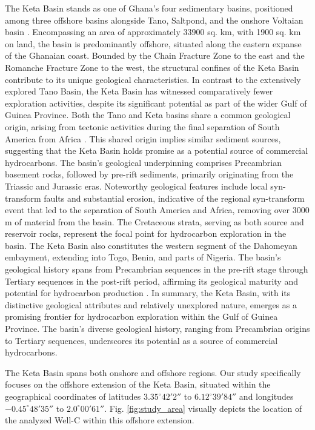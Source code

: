 \documentclass{gji}
\begin{document}
The Keta Basin stands as one of Ghana's four sedimentary basins, positioned among three offshore basins alongside Tano, Saltpond, and the onshore Voltaian basin \citep{lambon2020}.
Encompassing an area of approximately $33900$ sq. km, with 1900 sq. km on land, the basin is predominantly offshore, situated along the eastern expanse of the Ghanaian coast.
Bounded by the Chain Fracture Zone to the east and the Romanche Fracture Zone to the west, the structural confines of the Keta Basin contribute to its unique geological characteristics.
In contrast to the extensively explored Tano Basin, the Keta Basin has witnessed comparatively fewer exploration activities, despite its significant potential as part of the wider Gulf of Guinea Province. 
Both the Tano and Keta basins share a common geological origin, arising from tectonic activities during the final separation of South America from Africa \citep{falufosi2021geology}.
This shared origin implies similar sediment sources, suggesting that the Keta Basin holds promise as a potential source of commercial hydrocarbons.
The basin's geological underpinning comprises Precambrian basement rocks, followed by pre-rift sediments, primarily originating from the Triassic and Jurassic eras.
Noteworthy geological features include local syn-transform faults and substantial erosion, indicative of the regional syn-transform event that led to the separation of South America and Africa, removing over $3000$ m of material from the basin. 
The Cretaceous strata, serving as both source and reservoir rocks, represent the focal point for hydrocarbon exploration in the basin.
The Keta Basin also constitutes the western segment of the Dahomeyan embayment, extending into Togo, Benin, and parts of Nigeria. 
The basin's geological history spans from Precambrian sequences in the pre-rift stage through Tertiary sequences in the post-rift period, affirming its geological maturity and potential for hydrocarbon production \citep{akpati1978geologic}.
In summary, the Keta Basin, with its distinctive geological attributes and relatively unexplored nature, emerges as a promising frontier for hydrocarbon exploration within the Gulf of Guinea Province.
The basin's diverse geological history, ranging from Precambrian origins to Tertiary sequences, underscores its potential as a source of commercial hydrocarbons.

The Keta Basin spans both onshore and offshore regions. 
Our study specifically focuses on the offshore extension of the Keta Basin, situated within the geographical coordinates of latitudes \(3.35^\circ 42'2''\) to \(6.12^\circ 39'84''\) and longitudes \(-0.45^\circ 48'35''\) to \(2.0^\circ 00'61''\). 
Fig. \ref{fig:study_area} visually depicts the location of the analyzed Well-C within this offshore extension.
\end{document}
